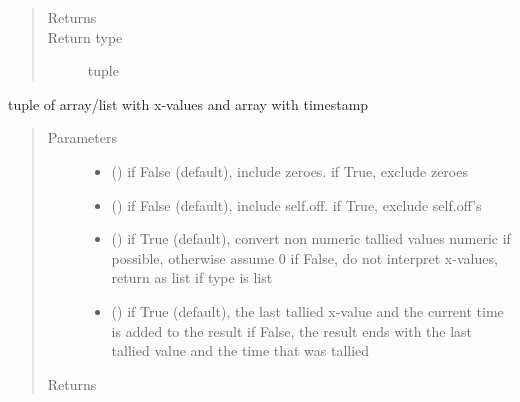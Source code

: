 \documentclass[letterpaper,10pt,english]{sphinxmanual}
\begin{document}
\begin{fulllineitems}
\begin{fulllineitems}
\begin{quote}
\begin{description}
\begin{itemize}
\end{itemize}

\item[{Returns}] \leavevmode
{}

\item[{Return type}] \leavevmode
tuple

\end{description}\end{quote}

\end{fulllineitems}


\begin{fulllineitems}
\label{\detokenize{Reference:salabim.MonitorTimestamp.xt}}
tuple of array/list with x-values and array with timestamp
\begin{quote}\begin{description}
\item[{Parameters}] \leavevmode\begin{itemize}
\item {} 
 () \textendash{} if False (default), include zeroes. if True, exclude zeroes

\item {} 
 () \textendash{} if False (default), include self.off. if True, exclude self.off’s

\item {} 
 () \textendash{} if True (default), convert non numeric tallied values numeric if possible, otherwise assume 0 
if False, do not interpret x-values, return as list if type is list

\item {} 
 () \textendash{} if True (default), the last tallied x-value and the current time is added to the result 
if False, the result ends with the last tallied value and the time that was tallied

\end{itemize}

\item[{Returns}] \leavevmode
{}


\end{description}
\end{quote}
\end{fulllineitems}
\end{fulllineitems}
\end{document}
